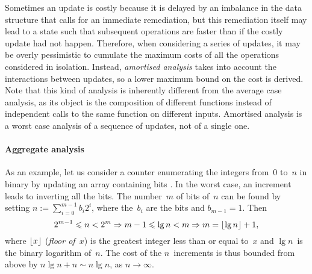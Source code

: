\label{par:amortised_cost}

Sometimes an update is costly because it is delayed by an imbalance in
the data structure that calls for an immediate remediation, but this
remediation itself may lead to a state such that subsequent operations
are faster than if the costly update had not happen. Therefore, when
considering a series of updates, it may be overly pessimistic to
cumulate the maximum costs of all the operations considered in
isolation. Instead, \emph{amortised
  analysis} \citep{Okasaki_1998a} \citep[\S{}17]{CLRS_2009} takes into
account the interactions between updates, so a lower maximum bound on
the cost is derived. Note that this kind of analysis is inherently
different from the average case analysis, as its object is the
composition of different functions instead of independent calls to the
same function on different inputs. Amortised analysis is a worst case
analysis of a sequence of updates, not of a single one.


\paragraph{Aggregate analysis}
\label{par:aggregate}

As an example, let us consider a counter enumerating the integers
from~\(0\) to~\(n\) in binary by updating an array containing bits
\cite[\S{}17.1]{CLRS_2009}. In the worst case, an increment leads to
inverting all the bits. The number~\(m\) of bits of~\(n\) can be found
by setting \(n := \sum_{i=0}^{m-1}{b_i2^i}\), where the~\(b_i\) are
the bits and \(b_{m-1}=1\). Then
\begin{equation}
2^{m-1} \leqslant n < 2^m \Rightarrow m - 1 \leqslant \lg n
< m \Rightarrow m = \lfloor{\lg n}\rfloor + 1,
\label{eq:num_of_bits}
\end{equation}
where \(\lfloor{x}\rfloor\) (\textsl{floor
  of~\(x\)}) is the greatest integer less than or equal to~\(x\) and
\(\lg n\)~is the binary logarithm of~\(n\). The cost of the
\(n\)~increments is thus bounded from above by \(n\lg n + n \sim n\lg
n\), as \(n \rightarrow \infty\).

